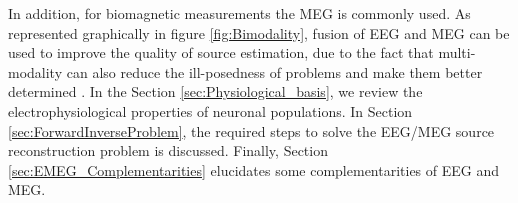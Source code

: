 In addition, for biomagnetic measurements the MEG is commonly used.
As represented graphically in figure \ref{fig:Bimodality}, fusion of EEG and MEG can be used to improve the quality of source estimation, due to the fact that multi-modality can also reduce the ill-posedness of problems and make them better determined \cite{Velmurugan2016}.
In the Section \ref{sec:Physiological_basis}, we review the electrophysiological properties of neuronal populations.
In Section \ref{sec:ForwardInverseProblem}, the required steps to solve the EEG/MEG source reconstruction problem is discussed.
Finally, Section \ref{sec:EMEG_Complementarities} elucidates some complementarities of EEG and MEG.

\FloatBarrier